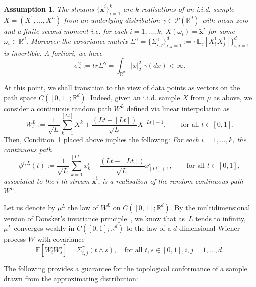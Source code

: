 \documentclass[twoside,11pt]{article}
\numberwithin{equation}{section}
\numberwithin{theorem}{section}
\newcommand{\R}{\mathbb{R}}
\newcommand{\ex}{\mathbb{E}}
\newtheorem{assumption}[theorem]{Assumption}
\begin{document}
\begin{assumption}\label{Assumption:iid}
The streams $\{\widetilde{\mathbf{x}}^i\}_{i=1}^{k}$ are $k$ realisations of an i.i.d.
sample $X=(X^1, \dots, X^L)$ from an underlying distribution $\gamma\in\mathscr{P}(\R^d)$ with mean zero and a finite second moment i.e. for each $i=1, \dots, k$, $X(\omega_i)=\widetilde{\mathbf{x}}^i$ for some $\omega_i\in\R^d$. 
Moreover the covariance matrix $\Sigma^\gamma=\{\Sigma^\gamma_{i,j}\}_{i,j=1}^{d}:=\{ \ex_\gamma[X^{1}_{i}X^{1}_{j}]\}_{i,j=1}^{d}$ is invertible. A fortiori, we have 
$$
\sigma_\gamma^2:=tr\Sigma^\gamma=\int_{\R^d} |x|_2^2\;\gamma(dx)<\infty.
$$ 
\end{assumption}

At this point, we shall transition to the view of data points as vectors on the path space $C([0,1]; \R^d)$. Indeed, given an i.i.d. sample $X$ from $\mu$ as above, we consider a continuous random path $W^L$ defined via linear interpolation as
\begin{equation}\label{eq:Donskerapprox}
W^L_t:=\frac{1}{ \sqrt{L}}\sum_{k=1}^{[Lt]}X^{k}+\frac{(Lt-[Lt])}{\sqrt{L}}X^{[Lt]+1},
\qquad\text{for all }
t\in[0,1].
\end{equation} 
Then, Condition~\ref{Assumption:iid} placed above implies the following:
\textit{
For each $i=1,\ldots, k$, the continuous path}
$$
\phi^{i, L}(t) :=    \frac{1}{\sqrt{L}}\sum_{k=1}^{[Lt]}x^i_{k}+\frac{(Lt-[Lt])}{\sqrt{L}}x^{i}_{[Lt]+1},\qquad\text{for all }
t\in[0,1],
$$
\textit{associated to the} $i$-\textit{th stream }$\mathbf{\tilde{x}^i}$, \textit{is a realisation of the random continuous path} $W^L$.

Let us denote by $\mu^L$ the law of $W^L$ on $C([0,1]; \R^d)$. By the multidimensional version of Donsker's invariance principle~\cite[Chapter XIII, Theorem 1.9]{revuz2013continuous}, we know that as~$L$ tends to infinity,
$\mu^L$ converges weakly in $C([0,1]; \R^d)$ to the law of a $d$-dimensional Wiener process $W$ with covariance 
\begin{equation}\label{eq:BM}
    \ex[W^i_t W^j_s]= \Sigma^\gamma_{i,j}(t\wedge s),
    \quad\text{for all } t,s\in[0,1], i,j=1,\dots, d.
\end{equation}

The following provides a guarantee for the topological conformance of a sample drawn from the approximating distribution:
\end{document}
